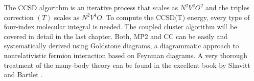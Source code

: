 \documentclass[12pt]{book} \usepackage[margin=1in]{geometry}
\begin{document}
The CCSD algorithm is an iterative process that
scales as $N^2V^2O^2$ and the triples correction $(T)$ scales as
$N^2V^4O$.  To compute the CCSD(T) energy, every type of four-index
molecular integral is needed.  The coupled cluster algorithm will be
covered in detail in the last chapter.
Both, MP2 and CC can be easily and systematically derived using
Goldstone diagrams, a diagrammatic approach to nonrelativistic fermion
interaction based on Feynman diagrams.  A very thorough treatment of
the many-body theory can be found in the excellent book by Shavitt and
Bartlet \cite{shavitt2009many}.






\end{document}
